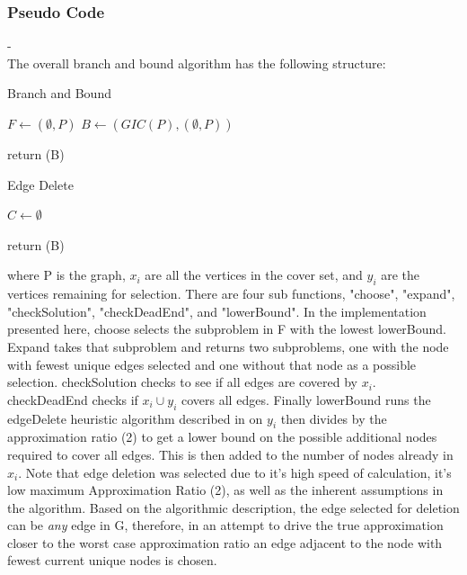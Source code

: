 \documentclass[acmlarge]{acmart}
\begin{document}
\subsubsection{Pseudo Code}
-\\
The overall branch and bound algorithm has the following structure:\\
\begin{algorithm}[H]
	\caption{Branch and Bound}
	\SetAlgoLined
	
	$F \leftarrow {(\emptyset,P)}$\;
	$B \leftarrow {(GIC(P),(\emptyset,P))}$\;
	
	return (B)
\end{algorithm}
\begin{algorithm}[H]
	\caption{Edge Delete}
	\SetAlgoLined
	
	$C \leftarrow \emptyset$\;
	
	return (B)
\end{algorithm}
where P is the graph, $x_i$ are all the vertices in the cover set, and $y_i$ are the vertices remaining for selection. There are four sub functions, "choose", "expand", "checkSolution", "checkDeadEnd", and "lowerBound". In the implementation presented here, choose selects the subproblem in F with the lowest lowerBound. Expand takes that subproblem and returns two subproblems, one with the node with fewest unique edges selected and one without that node as a possible selection. checkSolution checks to see if all edges are covered by $x_i$. checkDeadEnd checks if $x_i \cup y_i$ covers all edges. Finally lowerBound runs the edgeDelete heuristic algorithm described in \cite{Fran10} on $y_i$ then divides by the approximation ratio (2) to get a lower bound on the possible additional nodes required to cover all edges. This is then added to the number of nodes already in $x_i$.
Note that edge deletion was selected due to it's high speed of calculation, it's low maximum Approximation Ratio (2), as well as the inherent assumptions in the algorithm. Based on the algorithmic description, the edge selected for deletion can be \textit{any} edge in G, therefore, in an attempt to drive the true approximation closer to the worst case approximation ratio an edge adjacent to the node with fewest current unique nodes is chosen.
\end{document}
